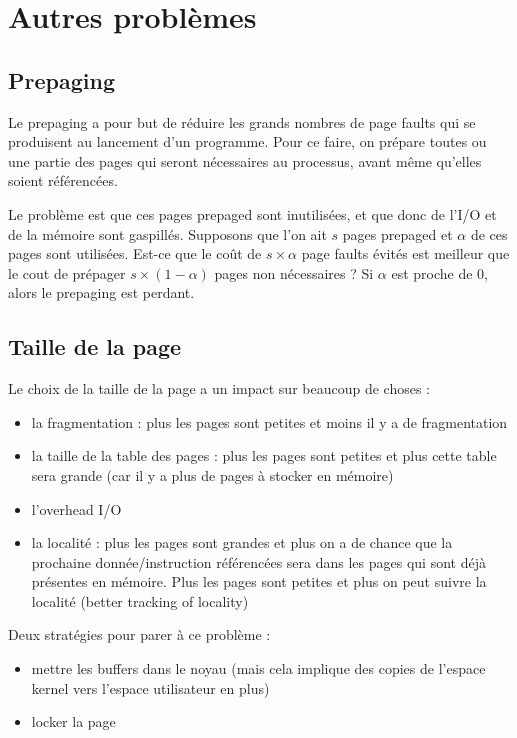 \section{Autres problèmes}

	\subsection{Prepaging}
	
	Le prepaging a pour but de réduire les grands nombres de page faults qui se produisent au lancement d'un programme. Pour ce faire, on prépare toutes ou une partie des pages qui seront nécessaires au processus, avant même qu'elles soient référencées.
	
	Le problème est que ces pages prepaged sont inutilisées, et que donc de l'I/O et de la mémoire sont gaspillés. Supposons que l'on ait $s$ pages prepaged et $\alpha$ de ces pages sont utilisées. Est-ce que le coût de $s \times \alpha$ page faults évités est meilleur que le cout de prépager $s \times (1 - \alpha)$ pages non nécessaires ? Si $\alpha$ est proche de 0, alors le prepaging est perdant.
	
	
	\subsection{Taille de la page}
	
	Le choix de la taille de la page a un impact sur beaucoup de choses :
	
	\begin{itemize}
		\item la fragmentation : plus les pages sont petites et moins il y a de fragmentation
		\item la taille de la table des pages : plus les pages sont petites et plus cette table sera grande (car il y a plus de pages à stocker en mémoire)
		\item l'overhead I/O
		\item la localité : plus les pages sont grandes et plus on a de chance que la prochaine donnée/instruction référencées sera dans les pages qui sont déjà présentes en mémoire. Plus les pages sont petites et plus on peut suivre la localité (better tracking of locality)
	\end{itemize}
	
	
	
	Deux stratégies pour parer à ce problème :
	
	\begin{itemize}
		\item mettre les buffers dans le noyau (mais cela implique des copies de l'espace kernel vers l'espace utilisateur en plus)
		\item locker la page
	\end{itemize}